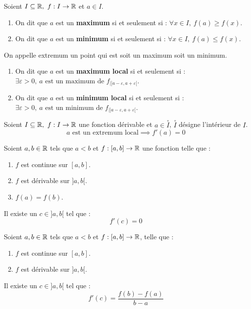 \begin{definition}
    Soient $I \subseteq \mathbb{R},\ f : I \to \mathbb{R}$ et $a \in I$.
    \begin{enumerate}
        \item On dit que $a$ est un \textbf{maximum} si et seulement si : $\forall x \in I,\ f(a) \geq f(x)$.
        \item On dit que $a$ est un \textbf{minimum} si et seulement si : $\forall x \in I,\ f(a) \leq f(x)$.
    \end{enumerate}
    On appelle extremum un point qui est soit un maximum soit un minimum.
    \begin{enumerate}
        \item On dit que $a$ est un \textbf{maximum local} si et seulement si : $\exists \varepsilon > 0,\ a \text{ est un maximum de } f_{|]a - \varepsilon, a + \varepsilon[}$.
        \item On dit que $a$ est un \textbf{minimum local} si et seulement si : $\exists \varepsilon > 0,\ a \text{ est un minimum de } f_{|]a - \varepsilon, a + \varepsilon[}$.
    \end{enumerate}
\end{definition}

\begin{theorem}
	Soient $I \subseteq \mathbb{R},\ f : I \to \mathbb{R}$ une fonction dérivable et $a \in \overset{\circ}{I}$, $\overset{\circ}{I}$ désigne l'intérieur de $I$. 
	\[ a \text{ est un extremum local} \implies f'(a) = 0 \]
\end{theorem}

\begin{theorem}
    Soient $a, b \in \mathbb{R}$ tels que $a < b$ et $f : [a, b] \to \mathbb{R}$ une fonction telle que :
    \begin{enumerate}
            \item $f$ est continue sur $[a, b]$.
            \item $f$ est dérivable sur $]a, b[$.
            \item $f(a) = f(b)$.
        \end{enumerate}
    \par \noindent Il existe un $c \in ]a, b[$ tel que : \[ f'(c) = 0 \]
\end{theorem}

\begin{theorem}
    Soient $a, b \in \mathbb{R}$ tels que $a < b$ et $f : [a, b] \to \mathbb{R}$, telle que : 
    \begin{enumerate}
            \item $f$ est continue sur $[a, b]$.
            \item $f$ est dérivable sur $]a, b[$.
        \end{enumerate}
    \par \noindent Il existe un $c \in ]a, b[$ tel que :
	\[ f'(c) = \frac{f(b) - f(a)}{b - a} \]
\end{theorem}

